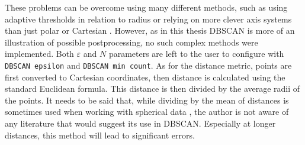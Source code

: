 These problems can be overcome using many different methods, such as using adaptive thresholds in relation to radius \cite{Kellner2012} or relying on more clever axis systems than just polar or Cartesian \cite{Sun2024}.
However, as in this thesis DBSCAN is more of an illustration of possible postprocessing, no such complex methods were implemented.
Both $\varepsilon$ and $N$ parameters are left to the user to configure with \texttt{DBSCAN epsilon} and \texttt{DBSCAN min count}.
As for the distance metric, points are first converted to Cartesian coordinates, then distance is calculated using the standard Euclidean formula.
This distance is then divided by the average radii of the points.
It needs to be said that, while dividing by the mean of distances is sometimes used when working with spherical data \cite{Fisher1993}, the author is not aware of any literature that would suggest its use in DBSCAN.
Especially at longer distances, this method will lead to significant errors.

\newpage
\pagestyle{plain}





\listoffigures

\listoftables



\clearpage
\openright


